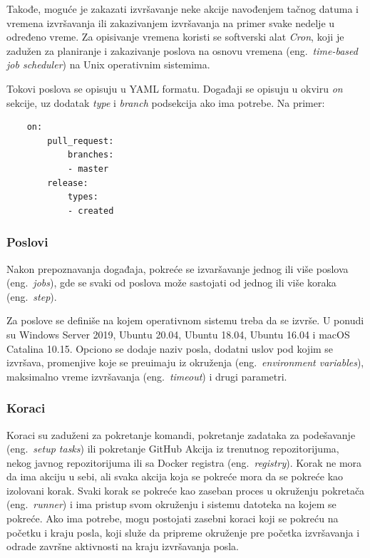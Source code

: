 \documentclass[12pt]{report}
\begin{document}
Takođe, moguće je zakazati izvršavanje neke akcije navođenjem tačnog datuma i vremena izvršavanja ili zakazivanjem izvršavanja na primer svake nedelje u određeno vreme. Za opisivanje vremena koristi se softverski alat \textit{Cron}, koji je zadužen za planiranje i zakazivanje poslova na osnovu vremena (eng.\ \textit{time-based job scheduler}) na Unix operativnim sistemima.

Tokovi poslova se opisuju u YAML formatu. Događaji se opisuju u okviru \textit{on} sekcije, uz dodatak \textit{type} i \textit{branch} podsekcija ako ima potrebe. Na primer:

\begin{samepage}
    \begin{verbatim}
    on:
        pull_request:
            branches:
            - master
        release:
            types:
            - created
    \end{verbatim}
\end{samepage}

\subsubsection{Poslovi}

Nakon prepoznavanja događaja, pokreće se izvaršavanje jednog ili više poslova (eng.\ \textit{jobs}), gde se svaki od poslova može sastojati od jednog ili više koraka (eng.\ \textit{step}).

Za poslove se definiše na kojem operativnom sistemu treba da se izvrše. U ponudi su Windows Server 2019, Ubuntu 20.04, Ubuntu 18.04, Ubuntu 16.04 i macOS Catalina 10.15. Opciono se dodaje naziv posla, dodatni uslov pod kojim se izvršava, promenjive koje se preuimaju iz okruženja (eng.\ \textit{environment variables}), maksimalno vreme izvršavanja (eng.\ \textit{timeout}) i drugi parametri.

\subsubsection{Koraci}

Koraci su zaduženi za pokretanje komandi, pokretanje zadataka za podešavanje (eng.\ \textit{setup tasks}) ili pokretanje GitHub Akcija iz trenutnog repozitorijuma, nekog javnog repozitorijuma ili sa Docker registra (eng.\ \textit{registry}). Korak ne mora da ima akciju u sebi, ali svaka akcija koja se pokreće mora da se pokreće kao izolovani korak. Svaki korak se pokreće kao zaseban proces u okruženju pokretača (eng.\ \textit{runner}) i ima pristup svom okruženju i sistemu datoteka na kojem se pokreće. Ako ima potrebe, mogu postojati zasebni koraci koji se pokreću na početku i kraju posla, koji služe da pripreme okruženje pre početka izvršavanja i odrade završne aktivnosti na kraju izvršavanja posla.
\end{document}
